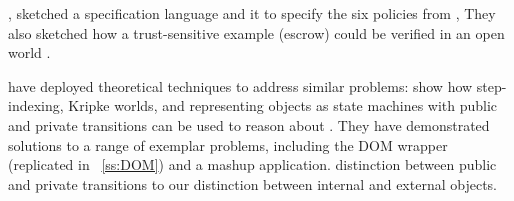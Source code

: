 {%
\cite{WAS-OOPSLA14-TR}, %
sketched a  specification language and    it to  
specify the six policies from \cite{MillerPhD}, %
They also
  sketched how 
a trust-sensitive 
example (escrow) could be verified in an open world
\cite{swapsies}. 
 
\cite{dd}  have deployed
  theoretical techniques to address similar problems:  %
   show how step-indexing, Kripke worlds, and representing objects
as state machines with public and private transitions can be used to
reason about %
.
They have demonstrated solutions to a range of exemplar problems,
including the DOM wrapper (replicated in 
~\ref{ss:DOM}) and a mashup application.
 distinction
between public and private transitions %
 to our
distinction between internal and external objects.

}
